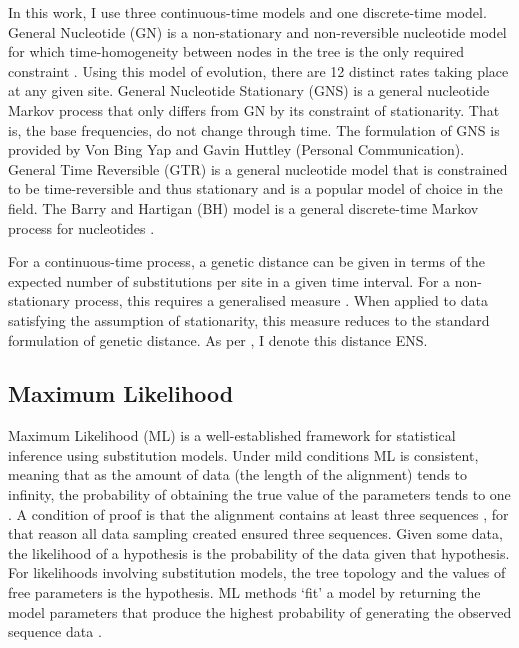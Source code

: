 In this work, I use three continuous-time models and one discrete-time model. General Nucleotide (GN) is a non-stationary and non-reversible nucleotide model for which time-homogeneity between nodes in the tree is the only required constraint \citep{Kaehler2015}. Using this model of evolution, there are 12 distinct rates taking place at any given site. General Nucleotide Stationary (GNS) is a general nucleotide Markov process that only differs from GN by its constraint of stationarity. That is, the base frequencies, do not change through time. The formulation of GNS is provided by Von Bing Yap and Gavin Huttley (Personal Communication). General Time Reversible (GTR) is a general nucleotide model that is constrained to be time-reversible and thus stationary \citep{Lanave1984ARates} and is a popular model of choice in the field. The Barry and Hartigan (BH) model is a general discrete-time Markov process for nucleotides \citep{Barry1987StatisticalEvolution}. 

For a continuous-time process, a genetic distance can be given in terms of the expected number of substitutions per site in a given time interval. For a non-stationary process, this requires a generalised measure \citep{Kaehler2015}. When applied to data satisfying the assumption of stationarity, this measure reduces to the standard formulation of genetic distance. As per \cite{Kaehler2015}, I denote this distance ENS. 

\subsection{Maximum Likelihood}

Maximum Likelihood (ML) is a well-established framework for statistical inference using substitution models. Under mild conditions ML is consistent, meaning that as the amount of data (the length of the alignment) tends to infinity, the probability of obtaining the true value of the parameters tends to one \citep{Chang1996FullConsistency}. A condition of proof is that the alignment contains at least three sequences \citep{Chang1996FullConsistency}, for that reason all data sampling created ensured three sequences. Given some data, the likelihood of a hypothesis is the probability of the data given that hypothesis. For likelihoods involving substitution models, the tree topology and the values of free parameters is the hypothesis. ML methods `fit' a model by returning the model parameters that produce the highest probability of generating the observed sequence data \citep{Felsenstein1981EvolutionaryApproach}.

